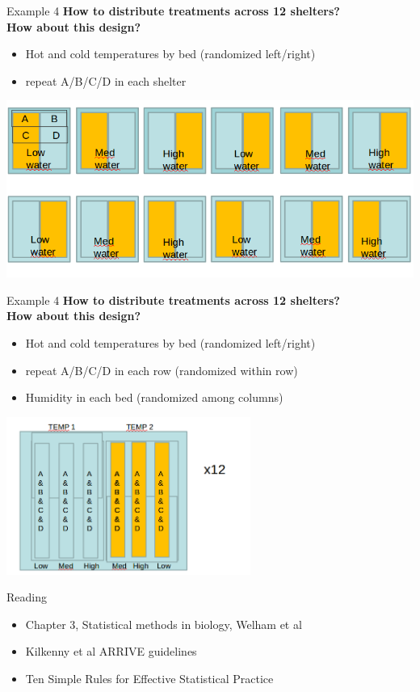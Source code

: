 \documentclass{beamer}
\begin{document}
\begin{frame}{Example 4}
\textbf{How to distribute treatments across 12 shelters?\\ How about this design?}
\begin{itemize}
 \item Hot and cold temperatures by bed (randomized left/right)
 \item repeat A/B/C/D in each shelter
\end{itemize}
  \centering
  \includegraphics[width=\textwidth]{Figures/shelters4}
\end{frame}

\begin{frame}{Example 4}
\textbf{How to distribute treatments across 12 shelters?\\ How about this design?}
\begin{itemize}
 \item Hot and cold temperatures by bed (randomized left/right)
 \item repeat A/B/C/D in each row (randomized within row)
 \item Humidity in each bed (randomized among columns)
\end{itemize}
  \centering
  \includegraphics[width=0.6\textwidth]{Figures/shelters5}
\end{frame}


\begin{frame}{Reading}

 \begin{itemize}
  \item Chapter 3, Statistical methods in biology, Welham et al
  \item Kilkenny et al ARRIVE guidelines
  \item Ten Simple Rules for Effective Statistical Practice
 \end{itemize}

\end{frame}
\end{document}
